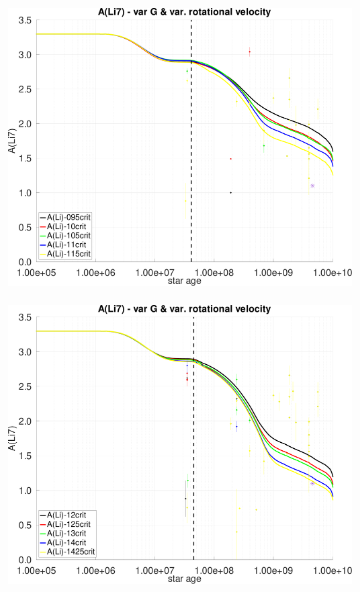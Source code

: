 \documentclass[fleqn,usenatbib]{mnras}
\begin{document}
\begin{ceqn}
\begin{figure}
    \centering
    \begin{subfigure}[h]{0.47\textwidth}
    \includegraphics[clip,width=\textwidth]{figures/paper2/li_var_vel_var_g_1.pdf}
    \label{fig:subim11}
    \end{subfigure}
    \begin{subfigure}[h]{0.47\textwidth}
    \includegraphics[clip,width=\textwidth]{figures/paper2/li_var_vel_var_g_3.pdf}
    \label{fig:subim12}
    \end{subfigure}
    \begin{subfigure}[h]{0.47\textwidth}

\end{subfigure}
\end{figure}
\end{ceqn}
\end{document}
